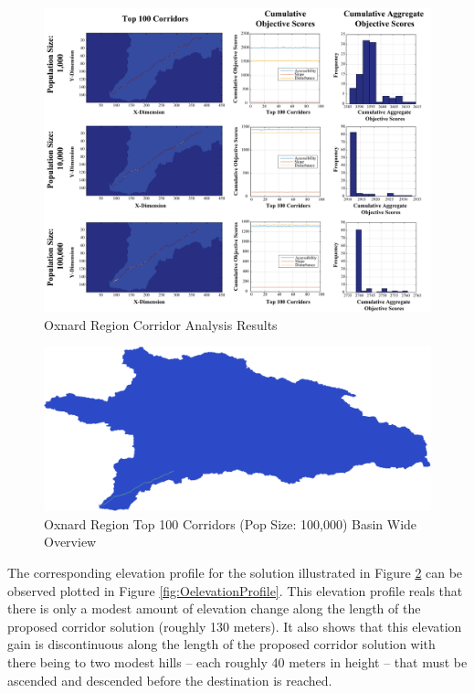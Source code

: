         \begin{figure}[!h]
            \begin{center}
            \includegraphics[width=6in]{figures/Oxnard_PathwayResults.png}   
            \caption{Oxnard Region Corridor Analysis Results}
            \label{fig:Oresults}
            \end{center}
        \end{figure}

        \begin{figure}[!h]
            \begin{center}
            \includegraphics[width=5.5in]{figures/Oxnard_PathwayLarge.png}   
            \caption{Oxnard Region Top 100 Corridors (Pop Size: 100,000) Basin Wide Overview}
            \label{fig:OsolutionOverview}
            \end{center}
        \end{figure}
        
The corresponding elevation profile for the solution illustrated in Figure \ref{fig:OsolutionOverview} can be observed plotted in Figure \ref{fig:OelevationProfile}. This elevation profile reals that there is only a modest amount of elevation change along the length of the proposed corridor solution (roughly 130 meters). It also shows that this elevation gain is discontinuous along the length of the proposed corridor solution with there being to two modest hills -- each roughly 40 meters in height -- that must be ascended and descended before the destination is reached. 
        
